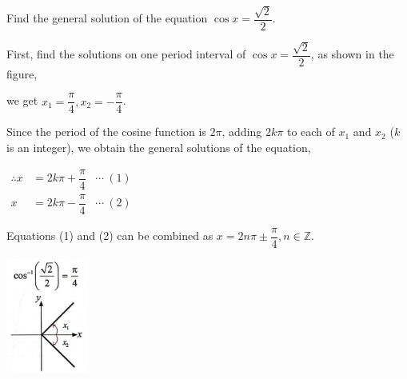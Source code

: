 \documentclass{report}
\begin{document}
\begin{question}
	Find the general solution of the equation $\cos x=\dfrac{\sqrt{2}}{2}$.
	
	\sol{}
	    
	\begin{vwcol}[widths={0.6,0.4}, sep=0.8cm, justify=flush,rule=0pt]
		\noindent First, find the solutions on one period interval of $\cos x=\dfrac{\sqrt{2}}{2}$, as shown in the figure,
		
		\noindent we get $x_1=\dfrac{\pi}{4}, x_2=-\dfrac{\pi}{4}$.
		
		\noindent Since the period of the cosine function is $2\pi$, adding $2k\pi$ to each of $x_1$ and $x_2$ ($k$ is an integer), we obtain the general solutions of the equation,
		
		\vspace{1em}
		\noindent $
		\begin{aligned}
			\therefore x & =2k\pi+\dfrac{\pi}{4} & \cdots\ (1) \\
			x            & =2k\pi-\dfrac{\pi}{4} & \cdots\ (2) 
		\end{aligned}
		$
		
		\noindent Equations (1) and (2) can be combined as $x=2n\pi\pm\dfrac{\pi}{4}, n \in \mathbb{Z}$.
		\vspace{2em}
		
		\includegraphics[width=0.2\textwidth]{assets/11-12.jpg}
	\end{vwcol}
	\vspace{-0.2em}
\end{question}
\end{document}
